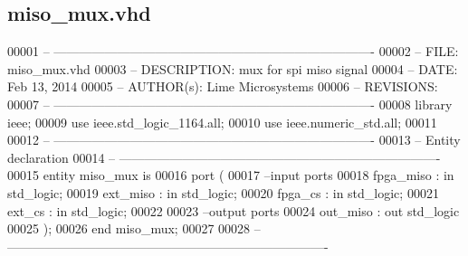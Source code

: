 \subsection{miso\+\_\+mux.\+vhd}
\label{miso__mux_8vhd_source}

\begin{DoxyCode}
00001 \textcolor{keyword}{-- ---------------------------------------------------------------------------- }
00002 \textcolor{keyword}{-- FILE:    miso\_mux.vhd}
00003 \textcolor{keyword}{-- DESCRIPTION: mux for spi miso signal}
00004 \textcolor{keyword}{-- DATE:    Feb 13, 2014}
00005 \textcolor{keyword}{-- AUTHOR(s):   Lime Microsystems}
00006 \textcolor{keyword}{-- REVISIONS:}
00007 \textcolor{keyword}{-- ---------------------------------------------------------------------------- }
00008 \textcolor{vhdlkeyword}{library }\textcolor{keywordflow}{ieee};
00009 \textcolor{vhdlkeyword}{use }ieee.std\_logic\_1164.\textcolor{keywordflow}{all};
00010 \textcolor{vhdlkeyword}{use }ieee.numeric\_std.\textcolor{keywordflow}{all};
00011 
00012 \textcolor{keyword}{-- ----------------------------------------------------------------------------}
00013 \textcolor{keyword}{-- Entity declaration}
00014 \textcolor{keyword}{-- ----------------------------------------------------------------------------}
00015 \textcolor{keywordflow}{entity }miso_mux \textcolor{keywordflow}{is}
00016   \textcolor{keywordflow}{port} \textcolor{vhdlchar}{(}
00017 \textcolor{keyword}{        --input ports }
00018         \textcolor{vhdlchar}{fpga_miso}       \textcolor{vhdlchar}{:} \textcolor{keywordflow}{in} \textcolor{comment}{std\_logic};
00019         \textcolor{vhdlchar}{ext_miso}           \textcolor{vhdlchar}{:} \textcolor{keywordflow}{in} \textcolor{comment}{std\_logic};
00020           \textcolor{vhdlchar}{fpga_cs}           \textcolor{vhdlchar}{:} \textcolor{keywordflow}{in} \textcolor{comment}{std\_logic};
00021           \textcolor{vhdlchar}{ext_cs}                \textcolor{vhdlchar}{:} \textcolor{keywordflow}{in} \textcolor{comment}{std\_logic};
00022 
00023 \textcolor{keyword}{        --output ports }
00024         \textcolor{vhdlchar}{out_miso}            \textcolor{vhdlchar}{:} \textcolor{keywordflow}{out} \textcolor{comment}{std\_logic}
00025         \textcolor{vhdlchar}{)};
00026 \textcolor{keywordflow}{end} \textcolor{vhdlchar}{miso\_mux};
00027 
00028 \textcolor{keyword}{-- ----------------------------------------------------------------------------}

\end{DoxyCode}
